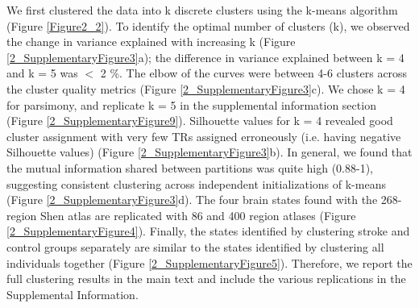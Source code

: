 \documentclass[phd,tocprelim]{cornell}
\begin{document}
	 We first clustered the data into k discrete clusters using the k-means algorithm (Figure \ref{Figure2_2}). To identify the optimal number of clusters (k), we observed the change in variance explained with increasing k (Figure \ref{2_SupplementaryFigure3}a); the difference in variance explained between k = 4 and k = 5 was $<$ 2 $\%$. The elbow of the curves were between 4-6 clusters across the cluster quality metrics (Figure \ref{2_SupplementaryFigure3}c).
	 We chose k = 4 for parsimony, and replicate k = 5 in the supplemental information section (Figure \ref{2_SupplementaryFigure9}). Silhouette values for k = 4 revealed good cluster assignment with very few TRs assigned erroneously (i.e. having negative Silhouette values) (Figure \ref{2_SupplementaryFigure3}b). In general, we found that the mutual information shared between partitions was quite high (0.88-1), suggesting consistent clustering across independent initializations of k-means (Figure \ref{2_SupplementaryFigure3}d). The four brain states found with the 268-region Shen atlas are replicated with 86 and 400 region atlases (Figure \ref{2_SupplementaryFigure4}). Finally, the states identified by clustering stroke and control groups separately are similar to the states identified by clustering all individuals together (Figure \ref{2_SupplementaryFigure5}). Therefore, we report the full clustering results in the main text and include the various replications in the Supplemental Information.
\end{document}
